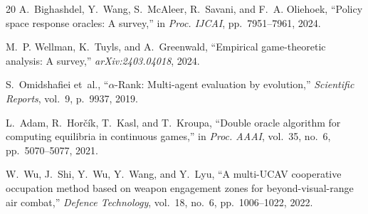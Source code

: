 \documentclass[12pt,a4paper]{article}
\begin{document}
\begin{thebibliography}{20}
A.~Bighashdel, Y.~Wang, S.~McAleer, R.~Savani, and F.~A. Oliehoek,
``Policy space response oracles: A survey,'' in \emph{Proc. IJCAI},
pp.~7951--7961, 2024.

M.~P. Wellman, K.~Tuyls, and A.~Greenwald, ``Empirical game-theoretic
analysis: A survey,'' \emph{arXiv:2403.04018}, 2024.

S.~Omidshafiei et~al., ``$\alpha$-Rank: Multi-agent evaluation by
evolution,'' \emph{Scientific Reports}, vol.~9, p.~9937, 2019.

L.~Adam, R.~Hor{\v{c}}{\'i}k, T.~Kasl, and T.~Kroupa, ``Double oracle
algorithm for computing equilibria in continuous games,'' in \emph{Proc.
AAAI}, vol.~35, no.~6, pp.~5070--5077, 2021.

W.~Wu, J.~Shi, Y.~Wu, Y.~Wang, and Y.~Lyu, ``A multi-UCAV cooperative
occupation method based on weapon engagement zones for beyond-visual-range
air combat,'' \emph{Defence Technology}, vol.~18, no.~6, pp.~1006--1022,
2022.

\end{thebibliography}
\end{document}
